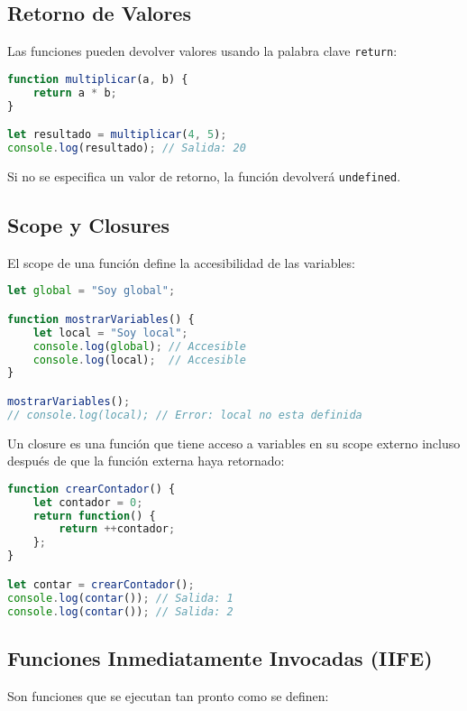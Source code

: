 \documentclass{book}
\begin{document}
\subsection{Retorno de Valores}

Las funciones pueden devolver valores usando la palabra clave \texttt{return}:

\begin{lstlisting}[language=JavaScript]
function multiplicar(a, b) {
    return a * b;
}

let resultado = multiplicar(4, 5);
console.log(resultado); // Salida: 20
\end{lstlisting}

Si no se especifica un valor de retorno, la función devolverá \texttt{undefined}.



\subsection{Scope y Closures}

El scope de una función define la accesibilidad de las variables:

\begin{lstlisting}[language=JavaScript]
let global = "Soy global";

function mostrarVariables() {
    let local = "Soy local";
    console.log(global); // Accesible
    console.log(local);  // Accesible
}

mostrarVariables();
// console.log(local); // Error: local no esta definida
\end{lstlisting}

Un closure es una función que tiene acceso a variables en su scope externo incluso después de que la función externa haya retornado:

\begin{lstlisting}[language=JavaScript]
function crearContador() {
    let contador = 0;
    return function() {
        return ++contador;
    };
}

let contar = crearContador();
console.log(contar()); // Salida: 1
console.log(contar()); // Salida: 2
\end{lstlisting}

\subsection{Funciones Inmediatamente Invocadas (IIFE)}

Son funciones que se ejecutan tan pronto como se definen:
\end{document}
